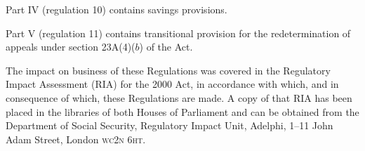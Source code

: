 \documentclass[12pt,a4paper]{article}
\begin{document}
Part IV (regulation 10) contains savings provisions.

Part V (regulation 11) contains transitional provision for the redetermination of appeals under section 23A(4)($b$)  of the Act.

The impact on business of these Regulations was covered in the Regulatory Impact Assessment (RIA) for the 2000 Act, in accordance with which, and in consequence of which, these Regulations are made. A copy of that RIA has been placed in the libraries of both Houses of Parliament and can be obtained from the Department of Social Security, Regulatory Impact Unit, Adelphi, 1–11 John Adam Street, London \textsc{\lowercase{WC2N 6HT}}. 
\end{document}
